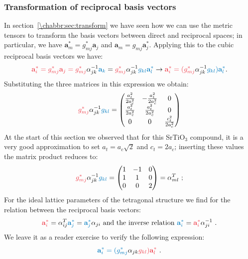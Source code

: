 \subsubsection{Transformation of reciprocal basis vectors}
In section~\ref{\chabbr:sec:transform} we have seen how we can use the metric tensors to transform the basis vectors between direct and reciprocal spaces; in particular, we have $\mathbf{a}^{\ast}_m = g^{\ast}_{mj} \mathbf{a}_j$ and $\mathbf{a}_m = g_{mj}\mathbf{a}^{\ast}_j$.  Applying this to the cubic reciprocal basis vectors we have:
\[
	{\color{OCScotsRose}\mathbf{a}^{\ast}_i =  g^{\ast}_{mj} \mathbf{a}_j=g^{\ast}_{mj}}\alpha^{-1}_{jk}{\color{OCHighlandsSkyBlue}\mathbf{a}_k}={\color{OCScotsRose}g^{\ast}_{mj}}\alpha^{-1}_{jk}{\color{OCHighlandsSkyBlue}g_{kl}\mathbf{a}^{\ast}_l}\rightarrow {\color{OCScotsRose}\mathbf{a}^{\ast}_i =(g^{\ast}_{mj}}\alpha^{-1}_{jk}{\color{OCHighlandsSkyBlue}g_{kl})\mathbf{a}^{\ast}_l}.
\]
Substituting the three matrices in this expression we obtain:
\[
	{\color{OCScotsRose}g^{\ast}_{mj}}\alpha^{-1}_{jk}{\color{OCHighlandsSkyBlue}g_{kl}} = \begin{pmatrix}\frac{a_t^2}{2a_c^2}&-\frac{a_t^2}{2a_c^2}&0\\
	\frac{a_t^2}{2a_c^2}&\frac{a_t^2}{2a_c^2}&0\\ 0&0&\frac{c_t^2}{2a_c^2}\end{pmatrix}
\]
At the start of this section we observed that for this SrTiO$_3$ compound, it is a very good approximation to set $a_t=a_c\sqrt{2}$ and $c_t=2a_c $; inserting these values the matrix product reduces to:
\[
	{\color{OCScotsRose}g^{\ast}_{mj}}\alpha^{-1}_{jk}{\color{OCHighlandsSkyBlue}g_{kl}} = \begin{pmatrix}1&-1&0\\ 1&1&0\\ 0&0&2\end{pmatrix} = \alpha^T_{ml}\ ;
\]
For the ideal lattice parameters of the tetragonal structure we find for the relation between the reciprocal basis vectors:
\[
	{\color{OCScotsRose}\mathbf{a}^{\ast}_i} = \alpha^T_{ij}{\color{OCHighlandsSkyBlue}\mathbf{a}^{\ast}_j} = {\color{OCHighlandsSkyBlue}\mathbf{a}^{\ast}_j}\alpha_{ji}\text{ and the inverse relation } {\color{OCHighlandsSkyBlue}\mathbf{a}^{\ast}_i} = {\color{OCScotsRose}\mathbf{a}^{\ast}_i}\alpha^{-1}_{ji}\ .
\]
We leave it as a reader exercise to verify the following expression:
\[
	{\color{OCHighlandsSkyBlue}\mathbf{a}^{\ast}_i =(g^{\ast}_{mj}}\alpha_{jk}{\color{OCScotsRose}g_{kl})\mathbf{a}^{\ast}_l}\ .
\]



